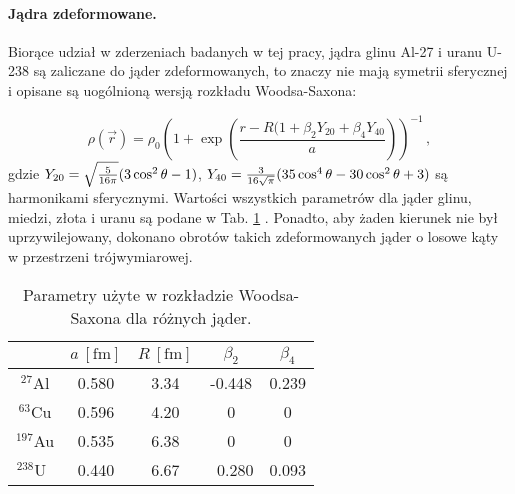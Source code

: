 \documentclass[a4paper,12pt]{article}
\begin{document}
\paragraph{Jądra zdeformowane.}
Biorące udział w zderzeniach badanych w tej pracy, jądra glinu Al-27 i uranu U-238 są zaliczane do jąder zdeformowanych, to znaczy nie mają symetrii sferycznej \quad i opisane są uogólnioną wersją rozkładu Woodsa-Saxona:

\begin{equation}
\rho(\vec{r})=\rho_0\left({1+\exp\left(\frac{r-R(1+\beta_2Y_{20}+\beta_4Y_{40}}{a}\right)}\right)^{-1}\,,
\end{equation}
gdzie $Y_{20}=\sqrt{ 5\over{16\pi}}(3\cos^{2}\theta-1)$, $Y_{40}={ 3\over {16\sqrt{\pi}}}(35\cos^{4}\theta-30\cos^{2}\theta+3)$ są harmonikami sferycznymi. Wartości wszystkich parametrów dla jąder glinu, miedzi, złota i uranu są podane w Tab. \ref{table0}  \cite{Loizides:2014vua,DeJager:1987qc}. Ponadto, aby żaden kierunek nie był uprzywilejowany, dokonano obrotów takich zdeformowanych jąder o losowe kąty w przestrzeni trójwymiarowej. 

\begin{table}[h!]
\begin{center}
\begin{tabular}{|c|c|c|c|c|} \hline
 & $a~[\mathrm{fm}]$ & $R~[\mathrm{fm}]$ & $\beta_2$ & $\beta_4$ \\ \hline
$^{27 }\!$Al     & 0.580 & 3.34 & -0.448 & 0.239 \\ \hline
$^{63 }  $Cu     & 0.596 & 4.20 &  0     &  0    \\ \hline
$^{197}\!$Au     & 0.535 & 6.38 &  0     &  0    \\ \hline
$^{238}  $U$~~$  & 0.440 & 6.67 & ~0.280 & 0.093 \\ \hline
\end{tabular}
\caption{\label{table0} 
Parametry użyte w rozkładzie Woodsa-Saxona dla różnych jąder.}
\end{center}
\end{table}
\end{document}
